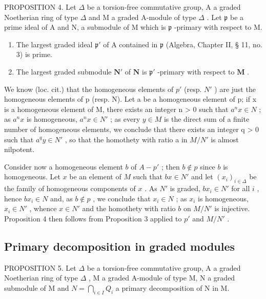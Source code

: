PROPOSITION 4. Let \(\Delta\) be a torsion-free commutative group, A a graded Noetherian ring of type \(\Delta\) and M a graded A-module of type \(\Delta\) . Let \(\mathfrak{p}\) be a prime ideal of A and N, a submodule of M which is \(\mathfrak{p}\) -primary with respect to M.

\begin{enumerate}
\def\labelenumi{(\roman{enumi})}
\item
  The largest graded ideal \(\mathfrak{p}'\) of A contained in \(\mathfrak{p}\) (Algebra, Chapter II, § 11, no. 3) is prime.
\item
  The largest graded submodule \(\mathbf{N}'\) of \(\mathbf{N}\) is \(\mathfrak{p}'\) -primary with respect to \(\mathbf{M}\) .
\end{enumerate}

We know (loc. cit.) that the homogeneous elements of \(p'\) (resp. \(N'\) ) are just the homogeneous elements of p (resp. N). Let a be a homogeneous element of p; if x is a homogeneous element of M, there exists an integer n \textgreater{} 0 such that \(a^{n}x \in N\) ; as \(a^{n}x\) is homogeneous, \(a^{n}x \in N'\) ; as every \(y \in M\) is the direct sum of a finite number of homogeneous elements, we conclude that there exists an integer q \textgreater{} 0 such that \(a^{q}y \in N'\) , so that the homothety with ratio a in \(M/N'\) is almost nilpotent.

Consider now a homogeneous element \(b\) of \(A - p'\) ; then \(b \notin p\) since \(b\) is homogeneous. Let \(x\) be an element of \(M\) such that \(bx \in N'\) and let \((x_i)_{i \in \Delta}\) be the family of homogeneous components of \(x\) . As \(N'\) is graded, \(bx_i \in N'\) for all \(i\) , hence \(bx_i \in N\) and, as \(b \notin p\) , we conclude that \(x_i \in N\) ; as \(x_i\) is homogeneous, \(x_i \in N'\) , whence \(x \in N'\) and the homothety with ratio \(b\) on \(M/N'\) is injective. Proposition 4 then follows from Proposition 3 applied to \(p'\) and \(M/N'\) .

\subsection{Primary decomposition in graded modules}

PROPOSITION 5. Let \(\Delta\) be a torsion-free commutative group, A a graded Noetherian ring of type \(\Delta\) , M a graded A-module of type M, N a graded submodule of M and \(N = \bigcap_{i \in I} Q_i\) a primary decomposition of N in M.

